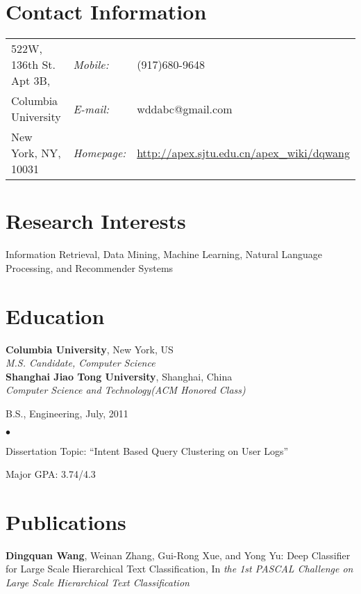 \documentclass[margin,line]{res}
\newenvironment{list1}{
  \begin{list}{\ding{113}}{%
      \setlength{\itemsep}{0in}
      \setlength{\parsep}{0in} \setlength{\parskip}{0in}
      \setlength{\topsep}{0in} \setlength{\partopsep}{0in} 
      \setlength{\leftmargin}{0.17in}}}{\end{list}}
\newenvironment{list2}{
  \begin{list}{$\bullet$}{%
      \setlength{\itemsep}{0in}
      \setlength{\parsep}{0in} \setlength{\parskip}{0in}
      \setlength{\topsep}{0in} \setlength{\partopsep}{0in} 
      \setlength{\leftmargin}{0.2in}}}{\end{list}}
\begin{document}

\begin{resume}
\section{\sc Contact Information}
\vspace{.05in}
\begin{tabular}{@{}p{2.5in}p{0.55in}p{2in}}
522W, 136th St. Apt 3B, & {\it Mobile:}& (917)680-9648 \\  
Columbia University& {\it E-mail:}& wddabc@gmail.com\\
New York, NY, 10031 & {\it Homepage:}& \href{http://apex.sjtu.edu.cn/apex\_wiki/dqwang}{http://apex.sjtu.edu.cn/apex\_wiki/dqwang}\\ 
\end{tabular}


\section{\sc Research Interests}
Information Retrieval, Data Mining, Machine Learning, Natural Language Processing, and Recommender Systems 
\section{\sc Education}

{\bf Columbia University}, New York, US\\
{\em M.S. Candidate, Computer Science}\\
{\bf Shanghai Jiao Tong University}, Shanghai, China\\
{\em Computer Science and Technology(ACM Honored Class)} 
\vspace*{-.0in}
\begin{list1}
\item[] B.S., Engineering, July, 2011 
\begin{list2}
\vspace*{.05in}
\item Dissertation Topic:  ``Intent Based Query Clustering on User Logs'' 
\item Major GPA: 3.74/4.3
\end{list2}
\end{list1}
\section{\sc Publications}
\textbf{Dingquan Wang}, Weinan Zhang, Gui-Rong Xue, and Yong Yu:
Deep Classifier for Large Scale Hierarchical Text Classification,
In\emph{ the 1st PASCAL Challenge on Large Scale Hierarchical Text Classification}


\end{resume}
\end{document}
